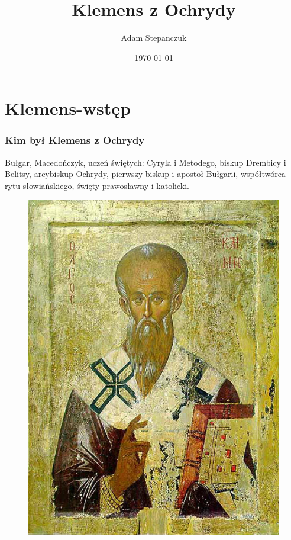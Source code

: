 \documentclass{beamer}
\title{Klemens z Ochrydy}
\author{Adam Stepanczuk}
\date{\today}
\begin{document}
\frame{\titlepage}

\section{Klemens-wstęp}
\begin{frame}
\frametitle{Kim był Klemens z Ochrydy}
Bułgar, Macedończyk, uczeń świętych: Cyryla i Metodego, biskup Drembicy i Belitsy, arcybiskup Ochrydy, pierwszy biskup i apostoł Bułgarii, współtwórca rytu słowiańskiego, święty prawosławny i katolicki.
\begin{figure}
\includegraphics[scale=0.25]{Climent_of_Ohrid.jpg}
\end{figure}
\end{frame}
\end{document}
